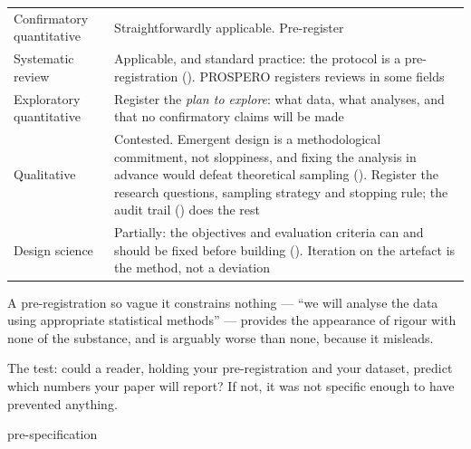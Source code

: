 \begin{center}
\small
\begin{tabular}{@{}L{3.2cm}L{11.1cm}@{}}
\toprule
Confirmatory quantitative
  & Straightforwardly applicable. Pre-register \\
Systematic review
  & Applicable, and standard practice: the protocol is a pre-registration
    (). PROSPERO registers reviews in some fields \\
Exploratory quantitative
  & Register the \emph{plan to explore}: what data, what analyses, and that no
    confirmatory claims will be made \\
Qualitative
  & Contested. Emergent design is a methodological commitment, not sloppiness,
    and fixing the analysis in advance would defeat theoretical sampling
    (). Register the research questions, sampling strategy
    and stopping rule; the audit trail () does the rest \\
Design science
  & Partially: the objectives and evaluation criteria can and should be fixed
    before building (). Iteration on the artefact is the
    method, not a deviation \\
\bottomrule
\end{tabular}
\end{center}

\begin{pitfall}
A pre-registration so vague it constrains nothing --- ``we will analyse the data
using appropriate statistical methods'' --- provides the appearance of rigour
with none of the substance, and is arguably worse than none, because it
misleads.

\medskip
The test: could a reader, holding your pre-registration and your dataset,
predict which numbers your paper will report? If not, it was not specific
enough to have prevented anything.
\end{pitfall}

\begin{traditions}{pre-specification}
\end{traditions}

